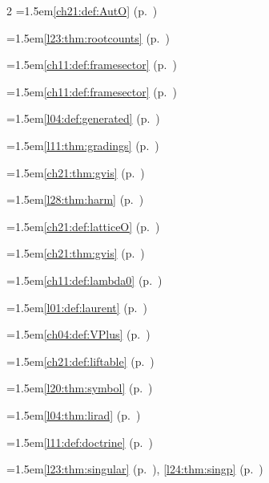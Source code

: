 \begin{multicols}{2}
\hangindent=1.5em\quad \ref{ch21:def:AutO} (p.~\pageref{ch21:def:AutO})\par
\hangindent=1.5em\quad \ref{l23:thm:rootcounts} (p.~\pageref{l23:thm:rootcounts})\par
\hangindent=1.5em\quad \ref{ch11:def:framesector} (p.~\pageref{ch11:def:framesector})\par
\hangindent=1.5em\quad \ref{ch11:def:framesector} (p.~\pageref{ch11:def:framesector})\par
\hangindent=1.5em\quad \ref{l04:def:generated} (p.~\pageref{l04:def:generated})\par
\hangindent=1.5em\quad \ref{l11:thm:gradings} (p.~\pageref{l11:thm:gradings})\par
\hangindent=1.5em\quad \ref{ch21:thm:gvis} (p.~\pageref{ch21:thm:gvis})\par
\hangindent=1.5em\quad \ref{l28:thm:harm} (p.~\pageref{l28:thm:harm})\par
\hangindent=1.5em\quad \ref{ch21:def:latticeO} (p.~\pageref{ch21:def:latticeO})\par
\hangindent=1.5em\quad \ref{ch21:thm:gvis} (p.~\pageref{ch21:thm:gvis})\par
\hangindent=1.5em\quad \ref{ch11:def:lambda0} (p.~\pageref{ch11:def:lambda0})\par
\hangindent=1.5em\quad \ref{l01:def:laurent} (p.~\pageref{l01:def:laurent})\par
\hangindent=1.5em\quad \ref{ch04:def:VPlus} (p.~\pageref{ch04:def:VPlus})\par
\hangindent=1.5em\quad \ref{ch21:def:liftable} (p.~\pageref{ch21:def:liftable})\par
\hangindent=1.5em\quad \ref{l20:thm:symbol} (p.~\pageref{l20:thm:symbol})\par
\hangindent=1.5em\quad \ref{l04:thm:lirad} (p.~\pageref{l04:thm:lirad})\par
\hangindent=1.5em\quad \ref{l11:def:doctrine} (p.~\pageref{l11:def:doctrine})\par
\hangindent=1.5em\quad \ref{l23:thm:singular} (p.~\pageref{l23:thm:singular}), \ref{l24:thm:singp} (p.~\pageref{l24:thm:singp})\par

\end{multicols}
